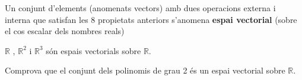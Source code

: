 \documentclass{beamer}
\begin{document}
\begin{frame}
  \begin{definicio}
    Un conjunt d'elements (anomenats vectors) amb dues operacions externa i interna que satisfan les 8 propietats anteriors s'anomena {\bf espai vectorial} (sobre el cos escalar dels nombres reals)
  \end{definicio}
  $\mathbb{R}$ , $\mathbb{R}^2$ i $\mathbb{R}^3$ són espais vectorials sobre $\mathbb{R}$.

\begin{exercise}{}{}
  Comprova que el conjunt dels polinomis de grau 2 és un espai vectorial sobre $\mathbb{R}$.
\end{exercise}

\end{frame}
\end{document}
